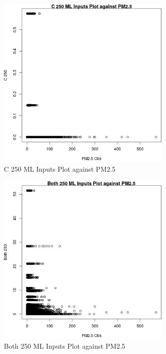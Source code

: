 \begin{figure} 
\centering  
\includegraphics[width=0.77\textwidth]{Code_Outputs/ML_input_report_ML_input_PM25_Step5_part_d_de_duplicated_aves_ML_input_C_250vPM25_Obs.jpg} 
\caption{\label{fig:ML_input_report_ML_input_PM25_Step5_part_d_de_duplicated_aves_ML_inputC_250vPM25_Obs}C 250 ML Inputs Plot against PM2.5} 
\end{figure} 
 

\begin{figure} 
\centering  
\includegraphics[width=0.77\textwidth]{Code_Outputs/ML_input_report_ML_input_PM25_Step5_part_d_de_duplicated_aves_ML_input_Both_250vPM25_Obs.jpg} 
\caption{\label{fig:ML_input_report_ML_input_PM25_Step5_part_d_de_duplicated_aves_ML_inputBoth_250vPM25_Obs}Both 250 ML Inputs Plot against PM2.5} 
\end{figure} 
 

